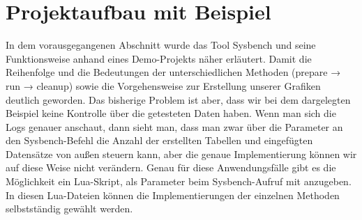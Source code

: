 
\section{Projektaufbau mit Beispiel}\label{sec:projektaufbau-mit-beispiel}
In dem vorausgegangenen Abschnitt wurde das Tool Sysbench und seine Funktionsweise anhand eines Demo-Projekts näher erläutert.
Damit die Reihenfolge und die Bedeutungen der unterschiedlichen Methoden (prepare → run → cleanup) sowie die Vorgehensweise zur Erstellung unserer Grafiken deutlich geworden.
Das bisherige Problem ist aber, dass wir bei dem dargelegten Beispiel keine Kontrolle über die getesteten Daten haben.
Wenn man sich die Logs genauer anschaut, dann sieht man, dass man zwar über die Parameter an den Sysbench-Befehl die Anzahl der erstellten Tabellen und eingefügten Datensätze von außen steuern kann, aber die genaue Implementierung können wir auf diese Weise nicht verändern.
Genau für diese Anwendungsfälle gibt es die Möglichkeit ein Lua-Skript, als Parameter beim Sysbench-Aufruf mit anzugeben.
In diesen Lua-Dateien können die Implementierungen der einzelnen Methoden selbstständig gewählt werden.


